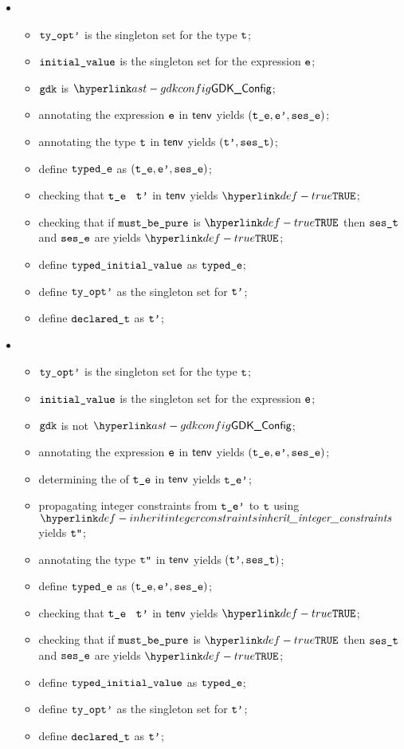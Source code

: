 \ProseParagraph
\OneApplies
\begin{itemize}
  \item {}
  \begin{itemize}
    \item $\texttt{ty\_opt'}$ is the singleton set for the type $\texttt{t}$;
    \item $\texttt{initial\_value}$ is the singleton set for the expression $\texttt{e}$;
    \item $\texttt{gdk}$ is $\GDKConfig$;
    \item annotating the expression $\texttt{e}$ in $\textsf{tenv}$ yields $(\texttt{t\_e}, \texttt{e'}, \texttt{ses\_e})$\ProseOrTypeError;
    \item annotating the type $\texttt{t}$ in $\textsf{tenv}$ yields $(\texttt{t'}, \texttt{ses\_t})$\ProseOrTypeError;
    \item define $\texttt{typed\_e}$ as $(\texttt{t\_e}, \texttt{e'}, \texttt{ses\_e})$;
    \item checking that $\texttt{t\_e}$ \typesatisfies\ $\texttt{t'}$ in $\textsf{tenv}$ yields $\True$\ProseOrTypeError;
    \item checking that if $\texttt{must\_be\_pure}$ is $\True$ then $\texttt{ses\_t}$ and $\texttt{ses\_e}$ are \pure{} yields $\True$\ProseOrTypeError;
    \item define $\texttt{typed\_initial\_value}$ as $\texttt{typed\_e}$;
    \item define $\texttt{ty\_opt'}$ as the singleton set for $\texttt{t'}$;
    \item define $\texttt{declared\_t}$ as $\texttt{t'}$;
  \end{itemize}

  \item {}
  \begin{itemize}
    \item $\texttt{ty\_opt'}$ is the singleton set for the type $\texttt{t}$;
    \item $\texttt{initial\_value}$ is the singleton set for the expression $\texttt{e}$;
    \item $\texttt{gdk}$ is not $\GDKConfig$;
    \item annotating the expression $\texttt{e}$ in $\textsf{tenv}$ yields $(\texttt{t\_e}, \texttt{e'}, \texttt{ses\_e})$\ProseOrTypeError;
    \item determining the \structure{} of $\texttt{t\_e}$ in $\textsf{tenv}$ yields $\texttt{t\_e'}$\ProseOrTypeError;
    \item propagating integer constraints from $\texttt{t\_e'}$ to $\texttt{t}$ using $\inheritintegerconstraints$ yields $\texttt{t''}$\ProseOrTypeError;
    \item annotating the type $\texttt{t''}$ in $\textsf{tenv}$ yields $(\texttt{t'}, \texttt{ses\_t})$\ProseOrTypeError;
    \item define $\texttt{typed\_e}$ as $(\texttt{t\_e}, \texttt{e'}, \texttt{ses\_e})$;
    \item checking that $\texttt{t\_e}$ \typesatisfies\ $\texttt{t'}$ in $\textsf{tenv}$ yields $\True$\ProseOrTypeError;
    \item checking that if $\texttt{must\_be\_pure}$ is $\True$ then $\texttt{ses\_t}$ and $\texttt{ses\_e}$ are \pure{} yields $\True$\ProseOrTypeError;
    \item define $\texttt{typed\_initial\_value}$ as $\texttt{typed\_e}$;
    \item define $\texttt{ty\_opt'}$ as the singleton set for $\texttt{t'}$;
    \item define $\texttt{declared\_t}$ as $\texttt{t'}$;
  \end{itemize}


\end{itemize}
